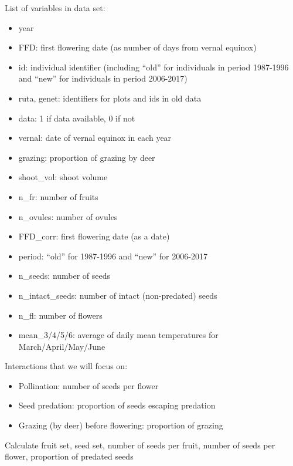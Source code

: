 \documentclass[
]{article}
\providecommand{\tightlist}{%
  \setlength{\itemsep}{0pt}\setlength{\parskip}{0pt}}
\begin{document}
List of variables in data set:

\begin{itemize}
\tightlist
\item
  year
\item
  FFD: first flowering date (as number of days from vernal equinox)
\item
  id: individual identifier (including ``old'' for individuals in period
  1987-1996 and ``new'' for individuals in period 2006-2017)
\item
  ruta, genet: identifiers for plots and ids in old data
\item
  data: 1 if data available, 0 if not
\item
  vernal: date of vernal equinox in each year
\item
  grazing: proportion of grazing by deer
\item
  shoot\_vol: shoot volume
\item
  n\_fr: number of fruits
\item
  n\_ovules: number of ovules
\item
  FFD\_corr: first flowering date (as a date)
\item
  period: ``old'' for 1987-1996 and ``new'' for 2006-2017
\item
  n\_seeds: number of seeds
\item
  n\_intact\_seeds: number of intact (non-predated) seeds
\item
  n\_fl: number of flowers
\item
  mean\_3/4/5/6: average of daily mean temperatures for
  March/April/May/June
\end{itemize}

Interactions that we will focus on:

\begin{itemize}
\tightlist
\item
  Pollination: number of seeds per flower
\item
  Seed predation: proportion of seeds escaping predation
\item
  Grazing (by deer) before flowering: proportion of grazing
\end{itemize}

Calculate fruit set, seed set, number of seeds per fruit, number of
seeds per flower, proportion of predated seeds
\end{document}
